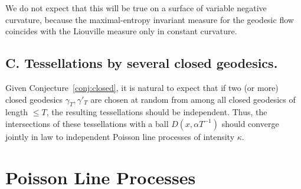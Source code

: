 \documentclass[AHL, Unicode, longabstracts, published]{cedram}
\begin{document}
We do not expect that this will be true on a surface of variable negative curvature, because the maximal-entropy invariant measure for the geodesic flow coincides with the Liouville measure only in constant curvature.

\subsection*{C. Tessellations by several closed geodesics.}
Given Conjecture~\ref{conj:closed}, it is natural to expect that if two (or more) closed geodesics $\gamma_{T},\gamma '_{T}$ are chosen at random from among all closed geodesics of length $\leq T$, the resulting tessellations should be independent. Thus, the intersections of these tessellations with a ball $D (x,\alpha T^{-1})$ should converge jointly in law to independent Poisson line processes of intensity $\kappa$.


\appendix{}
\section{Poisson Line Processes}\label{sec:appendix}
\end{document}
